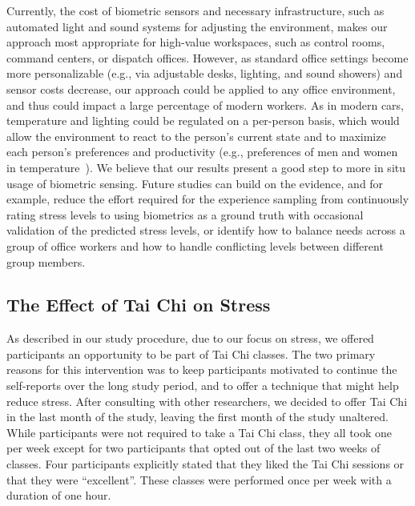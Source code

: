 Currently, the cost of biometric sensors and necessary infrastructure,
such as automated light and sound systems for adjusting the
environment, makes our approach most appropriate for high-value
workspaces, such as control rooms, command centers, or dispatch
offices. However, as standard office settings become more
personalizable (e.g., via adjustable desks, lighting, and sound
showers) and sensor costs decrease, our approach could be applied to
any office environment, and thus could impact a large percentage of
modern workers. As in modern cars, temperature and lighting could be
regulated on a per-person basis, which would allow the environment to
react to the person's current state and to maximize each person's
preferences and productivity (e.g., preferences of men and women in
temperature~\cite{Karjalainen07}). 
We believe that our results present a good step to more in situ usage of biometric sensing. Future studies can build on the evidence, and for example, reduce the effort required for the experience sampling from continuously rating stress levels to using biometrics as a ground truth with occasional validation of the predicted stress levels, or
identify how to balance needs across a group of office workers and how
to handle conflicting levels between different group members.




\subsection{The Effect of Tai Chi on Stress}
As described in our study procedure,
due to our focus on stress, we offered participants an opportunity to be part of Tai Chi classes.
The two primary reasons for this intervention was to keep participants motivated to continue the self-reports over the long study period, and to offer a technique that might help reduce stress.
After consulting with other researchers, we decided to offer Tai Chi in the last month of the study, leaving the first month of the study unaltered. While participants were not required to take a Tai Chi class, they all took one per week except for two participants that opted out of the last two weeks of classes. Four participants explicitly stated that they liked the Tai Chi sessions or that they were ``excellent''.
These classes were performed once per week with a duration of one hour.

